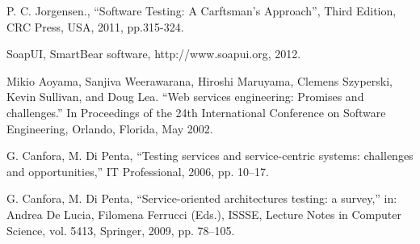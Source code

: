\documentclass{bredelebeamer}
\begin{document}
\begin{frame}[allowframebreaks]
\begin{thebibliography}{9}
	P. C. Jorgensen., ``Software Testing: A Carftsman’s Approach'', Third
	Edition, CRC Press, USA, 2011, pp.315-324.
	
	SoapUI, SmartBear software, http://www.soapui.org,
	2012.
	
	Mikio Aoyama, Sanjiva Weerawarana, Hiroshi
	Maruyama, Clemens Szyperski, Kevin Sullivan, and
	Doug Lea. ``Web services engineering: Promises and
	challenges.'' In Proceedings of the 24th International Conference on Software Engineering, Orlando,
	Florida, May 2002.
	
	G. Canfora, M. Di Penta, ``Testing services and service-centric systems: challenges and opportunities,'' IT Professional, 2006, pp. 10–17.
	
	G. Canfora, M. Di Penta, ``Service-oriented architectures testing: a survey,'' in: Andrea De Lucia, Filomena Ferrucci (Eds.), ISSSE, Lecture Notes in
	Computer Science, vol. 5413, Springer, 2009, pp. 78–105.
	

	
\end{thebibliography}
\end{frame}


\begin{frame}
\end{frame}
\end{document}
